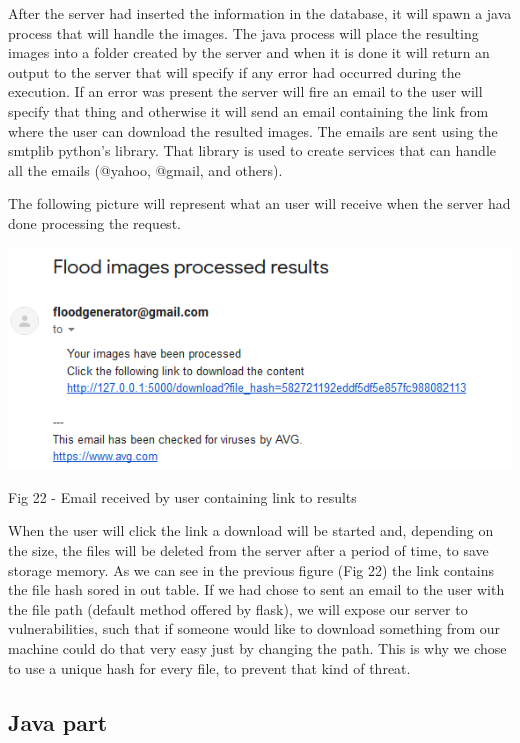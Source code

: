 \documentclass[12pt, a4paper]{report}
\begin{document}
After the server had inserted the information in the database, it will spawn a java process that will handle the images. The java process will place the resulting images into a folder created by the server and when it is done it will return an output to the server that will specify if any error had occurred during the execution. If an error was present the server will fire an email to the user will specify that thing and otherwise it will send an email containing the link from where the user can download the resulted images. The emails are sent using the smtplib python's library. That library is used to create services that can handle all the emails (@yahoo, @gmail, and others).
\par 

The following picture will represent what an user will receive when the server had done processing the request.

\medskip
\includegraphics[scale=1, center]{receive_email.png}
\begin{center}
Fig 22 - Email received by user containing link to results
\end{center}
\par 

When the user will click the link a download will be started and, depending on the size, the files will be deleted from the server after a period of time, to save storage memory. As we can see in the previous figure (Fig 22) the link contains the file hash sored in out table. If we had chose to sent an email to the user with the file path (default method offered by flask), we will expose our server to vulnerabilities, such that if someone would like to download something from our machine could do that very easy just by changing the path. This is why we chose to use a unique hash for every file, to prevent that kind of threat.

\subsection{Java part}
\end{document}
